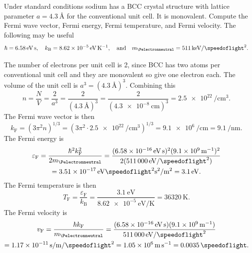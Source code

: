 \documentclass[fleqn]{NotesClass}
\newcommand*{\boltzmann}{k_{\mathrm{B}}}
\newcommand*{\fermi}{\mathrm{F}}
\begin{document}
    \begin{exm}{}{}
        Under standard conditions sodium has a BCC crystal structure with lattice parameter \(a = \qty{4.3}{\angstrom}\) for the conventional unit cell.
        It is monovalent.
        Compute the Fermi wave vector, Fermi energy, Fermi temperature, and Fermi velocity.
        The following may be useful
        \begin{equation}
            \hbar = \qty{6.58}{\electronvolt\second}, \quad \boltzmann = \qty{8.62e-5}{\electronvolt\per\kelvin}, \quad\text{and}\quad m_{\Pelectronneutral} = \qty{511}{\kilo\electronvolt\per\speedoflight\squared}.
        \end{equation}
        
        The number of electrons per unit cell is 2, since BCC has two atoms per conventional unit cell and they are monovalent so give one electron each.
        The volume of the unit cell is \(a^3 = (\qty{4.3}{\angstrom})^3\).
        Combining this
        \begin{equation}
            n = \frac{N}{V} = \frac{2}{a^3} = \frac{2}{(\qty{4.3}{\angstrom})^3} = \frac{2}{(\qty{4.3e-8}{\centi\metre})^3} = \qty{2.5e22}{\per\centi\metre\cubed}.
        \end{equation}
        The Fermi wave vector is then
        \begin{equation}
            k_{\fermi} = (3\pi^2 n)^{1/3} = (3\pi^2\cdot \qty{2.5e22}{\per\centi\metre\cubed})^{1/3} = \qty{9.1e6}{\per\centi\metre} = \qty{9.1}{\per\nano\metre}.
        \end{equation}
        The Fermi energy is
        \begin{multline}
            \varepsilon_{\fermi} = \frac{\hbar^2k_{\fermi}^2}{2m_{\Pelectronneutral}} = \frac{(\qty{6.58e-16}{\electronvolt\second})^2(\qty{9.1e9}{\per\metre})^2}{2(\qty{511000}{\electronvolt\per\speedoflight\squared})}\\ 
            = \qty{3.51e-17}{\electronvolt\speedoflight\squared\second\squared\per\meter\squared} = \qty{3.1}{\electronvolt}.
        \end{multline}
        The Fermi temperature is then
        \begin{equation}
            T_{\fermi} = \frac{\varepsilon_{\fermi}}{\boltzmann} = \frac{\qty{3.1}{\electronvolt}}{\qty{8.62e-5}{\electronvolt\per\kelvin}} = \qty{36320}{\kelvin}.
        \end{equation}
        The Fermi velocity is
        \begin{multline}
            v_{\fermi} = \frac{\hbar k_{\fermi}}{m_{\Pelectronneutral}} = \frac{(\qty{6.58e-16}{\electronvolt\second})(\qty{9.1e9}{\per\metre})}{\qty{511000}{\electronvolt\per\speedoflight\squared}}\\
            = \qty{1.17e-11}{\second\per\metre\per\speedoflight\squared} = \qty{1.05e6}{\metre\per\second} = \qty{0.0035}{\speedoflight}.
        \end{multline}
    \end{exm}
    
\end{document}
